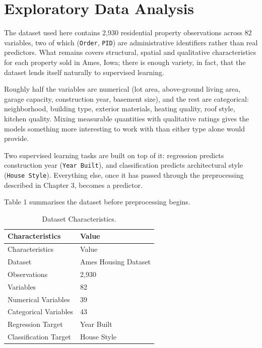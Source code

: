 \documentclass[11pt,a4paper]{article}
\let\oldsection\section
\renewcommand{\section}{\clearpage\oldsection}
\begin{document}
\section{Exploratory Data Analysis}\label{exploratory-data-analysis}

The dataset used here contains 2,930 residential property observations
across 82 variables, two of which (\texttt{Order}, \texttt{PID}) are
administrative identifiers rather than real predictors. What remains
covers structural, spatial and qualitative characteristics for each
property sold in Ames, Iowa; there is enough variety, in fact, that the
dataset lends itself naturally to supervised learning.

Roughly half the variables are numerical (lot area, above-ground living
area, garage capacity, construction year, basement size), and the rest
are categorical: neighborhood, building type, exterior materials,
heating quality, roof style, kitchen quality. Mixing measurable
quantities with qualitative ratings gives the models something more
interesting to work with than either type alone would provide.

Two supervised learning tasks are built on top of it: regression
predicts construction year (\texttt{Year\ Built}), and classification
predicts architectural style (\texttt{House\ Style}). Everything else,
once it has passed through the preprocessing described in Chapter 3,
becomes a predictor.

Table 1 summarises the dataset before preprocessing begins.

\begin{longtable}[]{@{}ll@{}}
\caption{Dataset
Characteristics.}\label{tbl-dataset-characteristics}\tabularnewline
\toprule\noalign{}
Characteristics & Value \\
\midrule\noalign{}
\endfirsthead
\toprule\noalign{}
Characteristics & Value \\
\midrule\noalign{}
\endhead
\bottomrule\noalign{}
\endlastfoot
Dataset & Ames Housing Dataset \autocite{DeCock2011} \\
Observations & 2,930 \\
Variables & 82 \\
Numerical Variables & 39 \\
Categorical Variables & 43 \\
Regression Target & Year Built \\
Classification Target & House Style \\
\end{longtable}
\end{document}
